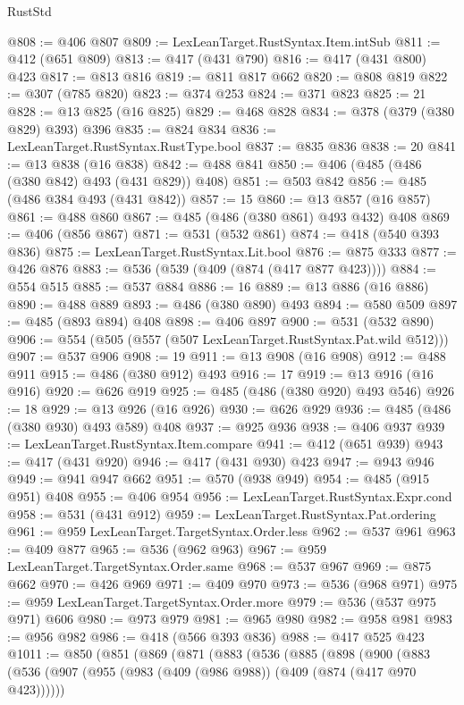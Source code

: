 \begin{lexlean}{RustStd}
\begin{coremodule}
@808 := @406 @807
@809 := LexLeanTarget.RustSyntax.Item.intSub
@811 := @412 (@651 @809)
@813 := @417 (@431 @790)
@816 := @417 (@431 @800) @423
@817 := @813 @816
@819 := @811 @817 @662
@820 := @808 @819
@822 := @307 (@785 @820)
@823 := @374 @253
@824 := @371 @823
@825 := 21
@828 := @13 @825 (@16 @825)
@829 := @468 @828
@834 := @378 (@379 (@380 @829) @393) @396
@835 := @824 @834
@836 := LexLeanTarget.RustSyntax.RustType.bool
@837 := @835 @836
@838 := 20
@841 := @13 @838 (@16 @838)
@842 := @488 @841
@850 := @406 (@485 (@486 (@380 @842) @493 (@431 @829)) @408)
@851 := @503 @842
@856 := @485 (@486 @384 @493 (@431 @842))
@857 := 15
@860 := @13 @857 (@16 @857)
@861 := @488 @860
@867 := @485 (@486 (@380 @861) @493 @432) @408
@869 := @406 (@856 @867)
@871 := @531 (@532 @861)
@874 := @418 (@540 @393 @836)
@875 := LexLeanTarget.RustSyntax.Lit.bool
@876 := @875 @333
@877 := @426 @876
@883 := @536 (@539 (@409 (@874 (@417 @877 @423))))
@884 := @554 @515
@885 := @537 @884
@886 := 16
@889 := @13 @886 (@16 @886)
@890 := @488 @889
@893 := @486 (@380 @890) @493
@894 := @580 @509
@897 := @485 (@893 @894) @408
@898 := @406 @897
@900 := @531 (@532 @890)
@906 := @554 (@505 (@557 (@507 LexLeanTarget.RustSyntax.Pat.wild @512)))
@907 := @537 @906
@908 := 19
@911 := @13 @908 (@16 @908)
@912 := @488 @911
@915 := @486 (@380 @912) @493
@916 := 17
@919 := @13 @916 (@16 @916)
@920 := @626 @919
@925 := @485 (@486 (@380 @920) @493 @546)
@926 := 18
@929 := @13 @926 (@16 @926)
@930 := @626 @929
@936 := @485 (@486 (@380 @930) @493 @589) @408
@937 := @925 @936
@938 := @406 @937
@939 := LexLeanTarget.RustSyntax.Item.compare
@941 := @412 (@651 @939)
@943 := @417 (@431 @920)
@946 := @417 (@431 @930) @423
@947 := @943 @946
@949 := @941 @947 @662
@951 := @570 (@938 @949)
@954 := @485 (@915 @951) @408
@955 := @406 @954
@956 := LexLeanTarget.RustSyntax.Expr.cond
@958 := @531 (@431 @912)
@959 := LexLeanTarget.RustSyntax.Pat.ordering
@961 := @959 LexLeanTarget.TargetSyntax.Order.less
@962 := @537 @961
@963 := @409 @877
@965 := @536 (@962 @963)
@967 := @959 LexLeanTarget.TargetSyntax.Order.same
@968 := @537 @967
@969 := @875 @662
@970 := @426 @969
@971 := @409 @970
@973 := @536 (@968 @971)
@975 := @959 LexLeanTarget.TargetSyntax.Order.more
@979 := @536 (@537 @975 @971) @606
@980 := @973 @979
@981 := @965 @980
@982 := @958 @981
@983 := @956 @982
@986 := @418 (@566 @393 @836)
@988 := @417 @525 @423
@1011 := @850
    (@851
      (@869
        (@871
          (@883
            (@536
              (@885
                (@898
                  (@900
                    (@883
                      (@536
                        (@907 (@955 (@983 (@409 (@986 @988)) (@409 (@874 (@417 @970 @423))))))

\end{coremodule}
\end{lexlean}

